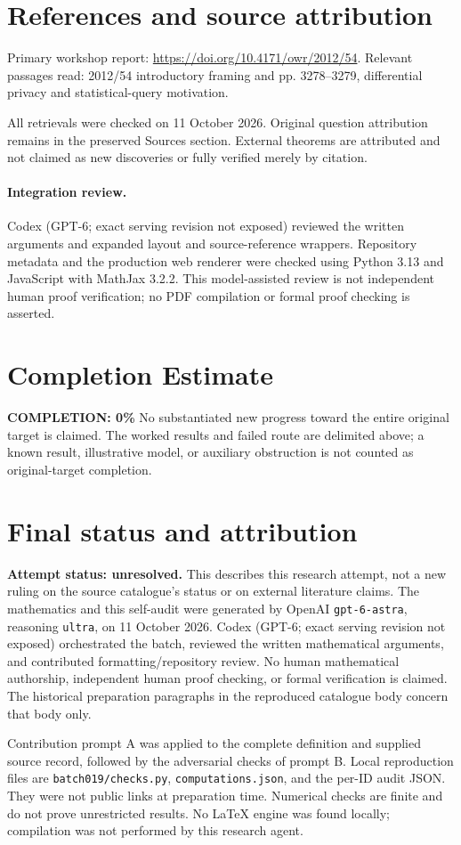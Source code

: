 \documentclass[11pt]{article}
\begin{document}
\section{References and source attribution}
Primary workshop report: \url{https://doi.org/10.4171/owr/2012/54}. Relevant passages read: 2012/54 introductory framing and pp. 3278--3279, differential privacy and statistical-query motivation.

All retrievals were checked on 11 October 2026. Original question attribution remains in the preserved Sources section. External theorems are attributed and not claimed as new discoveries or fully verified merely by citation.


\paragraph{Integration review.} Codex (GPT-6; exact serving revision not exposed) reviewed the written arguments and expanded layout and source-reference wrappers. Repository metadata and the production web renderer were checked using Python 3.13 and JavaScript with MathJax 3.2.2. This model-assisted review is not independent human proof verification; no PDF compilation or formal proof checking is asserted.

\section{Completion Estimate}
\noindent\textbf{COMPLETION: 0\%}
No substantiated new progress toward the entire original target is claimed. The worked results and failed route are delimited above; a known result, illustrative model, or auxiliary obstruction is not counted as original-target completion.

\section{Final status and attribution}
\textbf{Attempt status: unresolved.} This describes this research attempt, not a new ruling on the source catalogue's status or on external literature claims.
The mathematics and this self-audit were generated by OpenAI \texttt{gpt-6-astra}, reasoning \texttt{ultra}, on 11 October 2026. Codex (GPT-6; exact serving revision not exposed) orchestrated the batch, reviewed the written mathematical arguments, and contributed formatting/repository review. No human mathematical authorship, independent human proof checking, or formal verification is claimed. The historical preparation paragraphs in the reproduced catalogue body concern that body only.

Contribution prompt A was applied to the complete definition and supplied source record, followed by the adversarial checks of prompt B. Local reproduction files are \texttt{batch019/checks.py}, \texttt{computations.json}, and the per-ID audit JSON. They were not public links at preparation time. Numerical checks are finite and do not prove unrestricted results. No LaTeX engine was found locally; compilation was not performed by this research agent.
\end{document}
